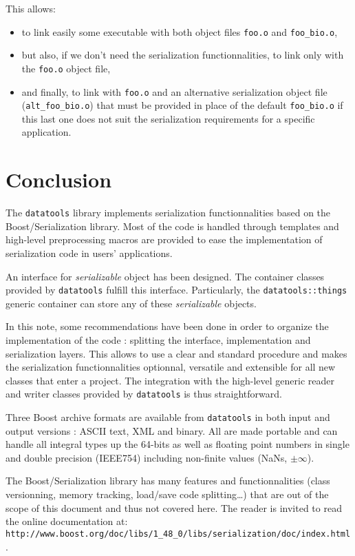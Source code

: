 \documentclass[a4paper,12pt]{article}
\newcommand{\pn}{\par\noindent}
\begin{document}
\pn This allows:
\begin{itemize}

\item to link easily some executable with both object files
 \texttt{foo.o} and \texttt{foo\_bio.o},

\item but also, if we  don't need the serialization functionnalities, to
  link only with the \texttt{foo.o} object file,

\item  and finally,  to link  with \texttt{foo.o}  and  an alternative
  serialization  object file  (\texttt{alt\_foo\_bio.o}) that  must be
  provided in  place of the  default \texttt{foo\_bio.o} if  this last
  one  does not  suit the  serialization requirements  for  a specific
  application.
\end{itemize}

\clearpage

\section{Conclusion}

The     \texttt{datatools}     library    implements     serialization
functionnalities based on the Boost/Se\-ria\-li\-za\-tion library. Most of the
code is handled through  templates and high-level preprocessing macros
are  provided to  ease  the implementation  of  serialization code  in
users' applications.

An  interface for  \emph{serializable} object  has been  designed. The
container   classes  provided   by  \texttt{datatools}   fulfill  this
interface. Particularly, the \texttt{datatools::things} generic
container can store any of these \emph{serializable} objects.

In this note, some recommendations have been done in order to organize
the   implementation  of   the   code  :   splitting  the   interface,
implementation and  serialization layers.  This allows to  use a clear
and  standard procedure and  makes the  serialization functionnalities
optionnal, versatile and  extensible for all new classes  that enter a
project.   The  integration with  the  high-level  generic reader  and
writer classes provided by \texttt{datatools} is thus straightforward.

Three Boost  archive formats  are available from  \texttt{datatools}
in both input and output versions :
ASCII text, XML  and binary. All are made portable  and can handle all
integral types  up the  64-bits as well  as floating point  numbers in
single  and  double precision  (IEEE754)  including non-finite  values
(NaNs, $\pm\infty$).


The Boost/Serialization library has many features and functionnalities
(class  versionning, memory  tracking,  load/save code  splitting\dots)
that  are out  of the  scope  of this  document and  thus not  covered
here.  The  reader  is   invited  to  read  the  online  do\-cumentation
at:\\ \texttt{http://www.boost.org/doc/libs/1\_48\_0/libs/serialization/doc/index.html}.
\end{document}
